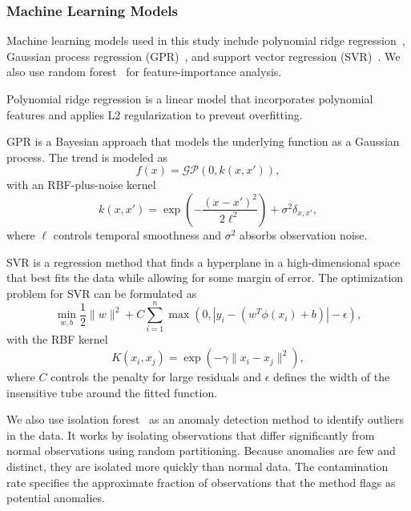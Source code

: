 \subsubsection{Machine Learning Models}

Machine learning models used in this study include polynomial ridge regression~\cite{hoerl1970ridge}, Gaussian process regression (GPR)~\cite{seeger2004gaussian}, and support vector regression (SVR)~\cite{smola2004tutorial}. We also use random forest~\cite{breiman2001random} for feature-importance analysis.

Polynomial ridge regression is a linear model that incorporates polynomial features and applies L2 regularization to prevent overfitting.

GPR is a Bayesian approach that models the underlying function as a Gaussian process. The trend is modeled as
\begin{equation}
	f(x) = \mathcal{GP}(0, k(x, x')),
\end{equation}
with an RBF-plus-noise kernel
\begin{equation}
	k(x, x') = \exp \left( -\frac{(x - x')^2}{2 \ell^2} \right) + \sigma^2 \delta_{x, x'},
\end{equation}
where $\ell$ controls temporal smoothness and $\sigma^2$ absorbs observation noise.

SVR is a regression method that finds a hyperplane in a high-dimensional space that best fits the data while allowing for some margin of error. The optimization problem for SVR can be formulated as
\begin{equation}
	\min_{w, b} \frac{1}{2} \| w \|^2 + C \sum_{i=1}^n \max(0, |y_i - (w^T \phi(x_i) + b)| - \epsilon),
\end{equation}
with the RBF kernel
\begin{equation}
	K(x_i, x_j) = \exp \left( -\gamma \| x_i - x_j \|^2 \right),
\end{equation}
where \(C\) controls the penalty for large residuals and \(\epsilon\) defines the width of the insensitive tube around the fitted function.

We also use isolation forest~\cite{liu2008isolation} as an anomaly detection method to identify outliers in the data.
It works by isolating observations that differ significantly from normal observations using random partitioning.
Because anomalies are few and distinct, they are isolated more quickly than normal data.
The contamination rate specifies the approximate fraction of observations that the method flags as potential anomalies.

